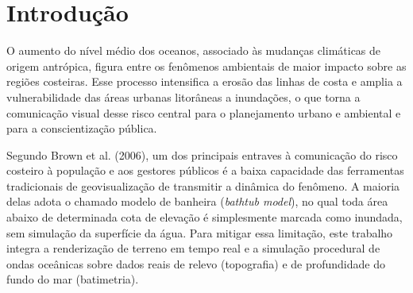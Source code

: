\documentclass[conference]{IEEEtran}
\begin{document}
\begin{abstract}
\textit{Abstract}---This paper presents an interactive scientific
visualization system for analyzing coastal erosion and sea level rise
scenarios, built on a real Digital Elevation Model (DEM) of the Baixada
Santista region (Brazil).  The goal was to determine
experimentally the geometric load beyond which the adaptive level of detail
technique CDLOD (Continuous Distance-Dependent Level of Detail) becomes
indispensable to keep the application interactive on the tested desktop GPU. The ocean surface was modeled with
six Gerstner waves, with a base height adjustable in real time, which
allows sea level rise scenarios of 0, +0.5, +1 and +2 meters to be
visualized. An automated windowless benchmark, run on an NVIDIA RTX 3060
graphics processing unit (GPU), compared rendering with and without level
of detail at five terrain resolutions. The results indicate a tipping point near 4 million triangles (2.7 to 4.3 million, depending on the criterion and the run), beyond which CDLOD becomes faster than the full mesh. Frustum culling cut frame time by 22\% and moved the tipping point to about 2.3 million. It is concluded that adaptive level of detail is what
makes real-time three-dimensional visualization of coastal flooding
feasible.

Keywords: Scientific visualization. Level of detail. Terrain rendering.
Ocean simulation. Sea level rise.
\end{abstract}

\section{Introdução}
\label{sec:intro}

O aumento do nível médio dos oceanos, associado às mudanças climáticas de
origem antrópica, figura entre os fenômenos ambientais de maior impacto
sobre as regiões costeiras. Esse processo intensifica a erosão das linhas de costa e amplia a vulnerabilidade das áreas urbanas litorâneas a inundações, o que torna a comunicação visual desse risco central para o planejamento urbano e ambiental e para a conscientização pública.

Segundo Brown et al. (2006), um dos principais entraves à comunicação do
risco costeiro à população e aos gestores públicos é a baixa capacidade
das ferramentas tradicionais de geovisualização de transmitir a dinâmica
do fenômeno. A maioria delas adota o chamado modelo de banheira
(\emph{bathtub model}), no qual toda área abaixo de determinada cota de
elevação é simplesmente marcada como inundada, sem simulação da
superfície da água. Para mitigar essa limitação, este trabalho integra a
renderização de terreno em tempo real e a simulação procedural de ondas
oceânicas sobre dados reais de relevo (topografia) e de profundidade do
fundo do mar (batimetria).
\end{document}
